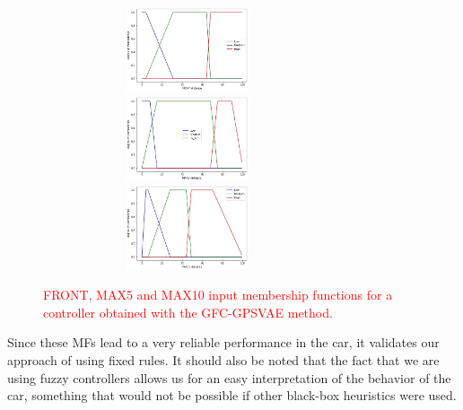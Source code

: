 \documentclass[10pt,journal,compsoc]{IEEEtran}
\begin{document}
%
\begin{figure}[h]	
  \begin{center}
    \includegraphics[width=8.5cm, height=2.5cm]{fig/FRONT.jpg}
    \includegraphics[width=8.5cm, height=2.5cm]{fig/MAX5.jpg}
    \includegraphics[width=8.5cm, height=2.5cm]{fig/MAX10.jpg}		
    \caption{\textcolor{red}{FRONT, MAX5 and MAX10 input membership functions for a controller obtained with the {\sf GFC-GPSVAE} method.}}
    \label{fig:frontmfs}
\end{center}	
\end{figure}
%

Since these MFs lead to a very reliable performance in the car, it
validates our approach of using fixed rules. It should
also be noted that the fact that we are using fuzzy controllers allows
us for an easy interpretation of the behavior of the car, something
that would not be possible if other black-box heuristics were used.

\end{document}
